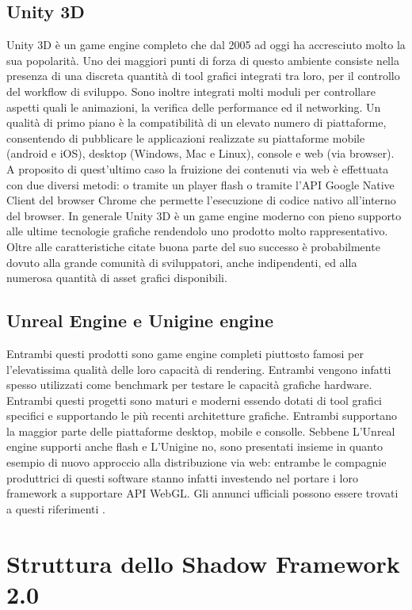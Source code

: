 \subsection{Unity 3D}
Unity 3D \`e un game engine completo che dal 2005 ad oggi ha accresciuto molto la sua popolarit\`a. Uno dei maggiori punti di forza di questo ambiente consiste nella presenza di una discreta quantit\`a di tool grafici integrati tra loro, per il controllo del workflow di sviluppo. Sono inoltre integrati molti moduli per controllare aspetti quali le animazioni, la verifica delle performance ed il networking.
Un qualit\`a di primo piano \`e la compatibilit\`a di un elevato numero di piattaforme, consentendo di pubblicare le applicazioni realizzate su piattaforme mobile (android e iOS), desktop (Windows, Mac e Linux), console e web (via browser).
A proposito di quest'ultimo caso la fruizione dei contenuti via web \`e effettuata con due diversi metodi: o tramite un player flash o tramite l'\ac{API} Google Native Client del browser Chrome che permette l'esecuzione di codice nativo all'interno del browser.
In generale Unity 3D \`e un game engine moderno con pieno supporto alle ultime tecnologie grafiche rendendolo uno prodotto molto rappresentativo.
Oltre alle caratteristiche citate buona parte del suo successo \`e probabilmente dovuto alla grande comunit\`a di sviluppatori, anche indipendenti, ed alla numerosa quantit\`a di asset grafici disponibili.


\subsection{Unreal Engine e Unigine engine}
Entrambi questi prodotti sono game engine completi piuttosto famosi per l'elevatissima qualit\`a delle loro capacit\`a di rendering. Entrambi vengono infatti spesso utilizzati come benchmark per testare le capacit\`a grafiche hardware. Entrambi questi progetti sono maturi e moderni essendo dotati di tool grafici specifici e supportando le pi\`u recenti architetture grafiche. Entrambi supportano la maggior parte delle piattaforme desktop, mobile e consolle. Sebbene L'Unreal engine supporti anche flash e L'Unigine no, sono presentati insieme in quanto esempio di nuovo approccio alla distribuzione via web: entrambe le compagnie produttrici di questi software stanno infatti investendo nel portare i loro framework a supportare \ac{API} WebGL. Gli annunci ufficiali possono essere trovati a questi riferimenti \cite{site:mozillaunrealannounce,site:unigineannounce}.



\section{Struttura dello Shadow Framework 2.0}
\label{sec:sfstructure}